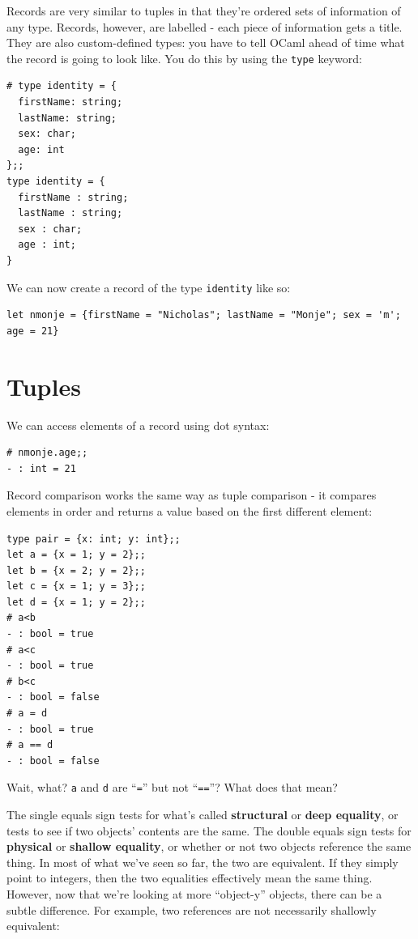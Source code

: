 \documentclass[10pt]{book}
\begin{document}
{Records are very similar to tuples in that they're ordered sets of information of any type. Records, however, are labelled - each piece of information gets a title. They are also custom-defined types: you have to tell OCaml ahead of time what the record is going to look like. You do this by using the {\tt type} keyword:

\beforeverb
\begin{verbatim}
# type identity = {
  firstName: string;
  lastName: string; 
  sex: char; 
  age: int
};;
type identity = {
  firstName : string;
  lastName : string;
  sex : char;
  age : int;
}
\end{verbatim}
\afterverb

We can now create a record of the type {\tt identity} like so:

\beforeverb
\begin{verbatim}
let nmonje = {firstName = "Nicholas"; lastName = "Monje"; sex = 'm'; age = 21}
\end{verbatim}
\afterverb
\section{Tuples}

We can access elements of a record using dot syntax:

\beforeverb
\begin{verbatim}
# nmonje.age;;
- : int = 21
\end{verbatim}
\afterverb

Record comparison works the same way as tuple comparison - it compares 
elements in order and returns a value based on the first different element:

\beforeverb
\begin{verbatim}
type pair = {x: int; y: int};;
let a = {x = 1; y = 2};;
let b = {x = 2; y = 2};;
let c = {x = 1; y = 3};;
let d = {x = 1; y = 2};;
# a<b
- : bool = true
# a<c
- : bool = true
# b<c
- : bool = false
# a = d
- : bool = true
# a == d
- : bool = false
\end{verbatim}
\afterverb

Wait, what? {\tt a} and {\tt d} are ``{\tt =}'' but not ``{\tt ==}''? What does that mean?

The single equals sign tests for what's called {\bf structural} or {\bf deep equality}, or tests to see if two objects' contents are the same. The double equals sign tests for {\bf physical} or {\bf shallow equality}, or whether or not two objects reference the same thing. In most of what we've seen so far, the two are equivalent. If they simply point to integers, then the two equalities effectively mean the same thing. However, now that we're looking at more ``object-y'' objects, there can be a subtle difference. For example, two references are not necessarily shallowly equivalent:

}
\end{document}
